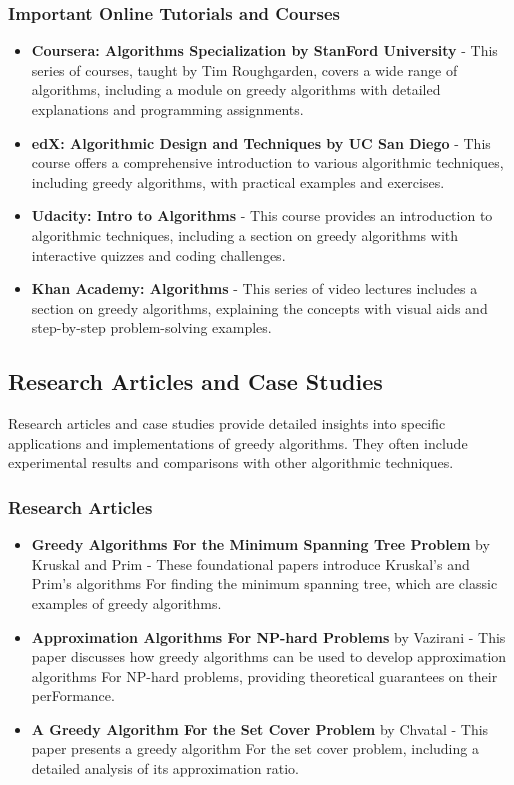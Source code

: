 \documentclass[12pt]{book} %
\begin{document}
\subsubsection*{Important Online Tutorials and Courses}
\begin{itemize}
    \item \textbf{Coursera: Algorithms Specialization by StanFord University} - This series of courses, taught by Tim Roughgarden, covers a wide range of algorithms, including a module on greedy algorithms with detailed explanations and programming assignments.
    \item \textbf{edX: Algorithmic Design and Techniques by UC San Diego} - This course offers a comprehensive introduction to various algorithmic techniques, including greedy algorithms, with practical examples and exercises.
    \item \textbf{Udacity: Intro to Algorithms} - This course provides an introduction to algorithmic techniques, including a section on greedy algorithms with interactive quizzes and coding challenges.
    \item \textbf{Khan Academy: Algorithms} - This series of video lectures includes a section on greedy algorithms, explaining the concepts with visual aids and step-by-step problem-solving examples.
\end{itemize}

\subsection{Research Articles and Case Studies}
Research articles and case studies provide detailed insights into specific applications and implementations of greedy algorithms. They often include experimental results and comparisons with other algorithmic techniques.

\subsubsection*{Research Articles}
\begin{itemize}
    \item \textbf{Greedy Algorithms For the Minimum Spanning Tree Problem} by Kruskal and Prim - These foundational papers introduce Kruskal's and Prim's algorithms For finding the minimum spanning tree, which are classic examples of greedy algorithms.
    \item \textbf{Approximation Algorithms For NP-hard Problems} by Vazirani - This paper discusses how greedy algorithms can be used to develop approximation algorithms For NP-hard problems, providing theoretical guarantees on their perFormance.
    \item \textbf{A Greedy Algorithm For the Set Cover Problem} by Chvatal - This paper presents a greedy algorithm For the set cover problem, including a detailed analysis of its approximation ratio.
\end{itemize}
\end{document}
